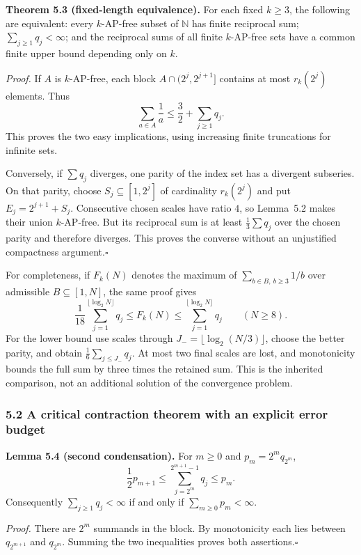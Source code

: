 \medskip
\noindent\textbf{Theorem 5.3 (fixed-length equivalence).}
For each fixed $k\ge3$, the following are equivalent: every $k$-AP-free subset of $\mathbb N$ has finite reciprocal sum; $\sum_{j\ge1}q_j<\infty$; and the reciprocal sums of all finite $k$-AP-free sets have a common finite upper bound depending only on $k$.

\noindent\emph{Proof.}
If $A$ is $k$-AP-free, each block $A\cap(2^j,2^{j+1}]$ contains at most $r_k(2^j)$ elements. Thus
\begin{equation}\label{r2:dyadicupper}
\sum_{a\in A}\frac1a\le\frac32+\sum_{j\ge1}q_j.
\end{equation}
This proves the two easy implications, using increasing finite truncations for infinite sets.

Conversely, if $\sum q_j$ diverges, one parity of the index set has a divergent subseries. On that parity, choose $S_j\subseteq[1,2^j]$ of cardinality $r_k(2^j)$ and put $E_j=2^{j+1}+S_j$. Consecutive chosen scales have ratio $4$, so Lemma~5.2 makes their union $k$-AP-free. But its reciprocal sum is at least $\frac13\sum q_j$ over the chosen parity and therefore diverges. This proves the converse without an unjustified compactness argument.\hfill$\square$

For completeness, if $F_k(N)$ denotes the maximum of $\sum_{b\in B,\ b\ge3}1/b$ over admissible $B\subseteq[1,N]$, the same proof gives
\[
\frac1{18}\sum_{j=1}^{\lfloor\log_2N\rfloor}q_j
\le F_k(N)\le\sum_{j=1}^{\lfloor\log_2N\rfloor}q_j\qquad(N\ge8).
\]
For the lower bound use scales through $J_- =\lfloor\log_2(N/3)\rfloor$, choose the better parity, and obtain $\frac16\sum_{j\le J_-}q_j$. At most two final scales are lost, and monotonicity bounds the full sum by three times the retained sum. This is the inherited comparison, not an additional solution of the convergence problem.

\subsubsection{5.2 A critical contraction theorem with an explicit error budget}

\noindent\textbf{Lemma 5.4 (second condensation).}
For $m\ge0$ and $p_m=2^mq_{2^m}$,
\[
\frac12p_{m+1}
\le\sum_{j=2^m}^{2^{m+1}-1}q_j
\le p_m.
\]
Consequently $\sum_{j\ge1}q_j<\infty$ if and only if $\sum_{m\ge0}p_m<\infty$.

\noindent\emph{Proof.}
There are $2^m$ summands in the block. By monotonicity each lies between $q_{2^{m+1}}$ and $q_{2^m}$. Summing the two inequalities proves both assertions.\hfill$\square$

